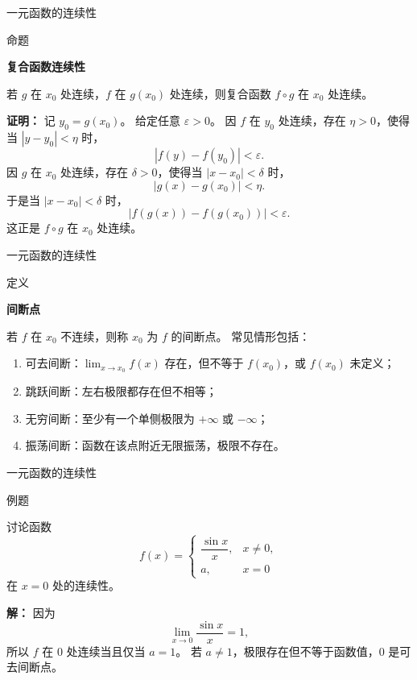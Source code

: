 \documentclass[aspectratio=169,10pt,fontset=fandol]{ctexbeamer}
\begin{document}
\begin{frame}[t,fragile]{一元函数的连续性}
\footnotesize
\begin{block}{命题}
{\footnotesize
\textbf{复合函数连续性}\par

若 $g$ 在 $x_0$ 处连续，$f$ 在 $g(x_0)$ 处连续，则复合函数 $f\circ g$ 在 $x_0$ 处连续。

}
\end{block}
\pause
{\footnotesize
\textbf{证明：}
记 $y_0=g(x_0)$。 给定任意 $\varepsilon>0$。 因 $f$ 在 $y_0$ 处连续，存在 $\eta>0$，使得当 $|y-y_0|<\eta$ 时，
\[
|f(y)-f(y_0)|<\varepsilon.
\]
因 $g$ 在 $x_0$ 处连续，存在 $\delta>0$，使得当 $|x-x_0|<\delta$ 时，
\[
|g(x)-g(x_0)|<\eta.
\]
于是当 $|x-x_0|<\delta$ 时，
\[
|f(g(x))-f(g(x_0))|<\varepsilon.
\]
这正是 $f\circ g$ 在 $x_0$ 处连续。

}
\end{frame}
\begin{frame}[t,fragile]{一元函数的连续性}
\footnotesize
\begin{block}{定义}
{\footnotesize
\textbf{间断点}\par

若 $f$ 在 $x_0$ 不连续，则称 $x_0$ 为 $f$ 的间断点。 常见情形包括：
\begin{enumerate}[label=(\arabic*),leftmargin=2em]
\item 可去间断：$\lim_{x\to x_0}f(x)$ 存在，但不等于 $f(x_0)$，或 $f(x_0)$ 未定义；
\item 跳跃间断：左右极限都存在但不相等；
\item 无穷间断：至少有一个单侧极限为 \(+\infty\) 或 \(-\infty\)；
\item 振荡间断：函数在该点附近无限振荡，极限不存在。
\end{enumerate}

}
\end{block}
\end{frame}
\begin{frame}[t,fragile]{一元函数的连续性}
\footnotesize
\begin{block}{例题}
{\footnotesize
讨论函数
\[
f(x)=
\begin{cases}
\dfrac{\sin x}{x},&x\neq0,\\
a,&x=0
\end{cases}
\]
在 $x=0$ 处的连续性。

}
\end{block}
\pause
{\footnotesize
\textbf{解：}
因为
\[
\lim_{x\to0}\frac{\sin x}{x}=1,
\]
所以 $f$ 在 $0$ 处连续当且仅当 $a=1$。 若 $a\neq1$，极限存在但不等于函数值，$0$ 是可去间断点。

}
\end{frame}
\end{document}
